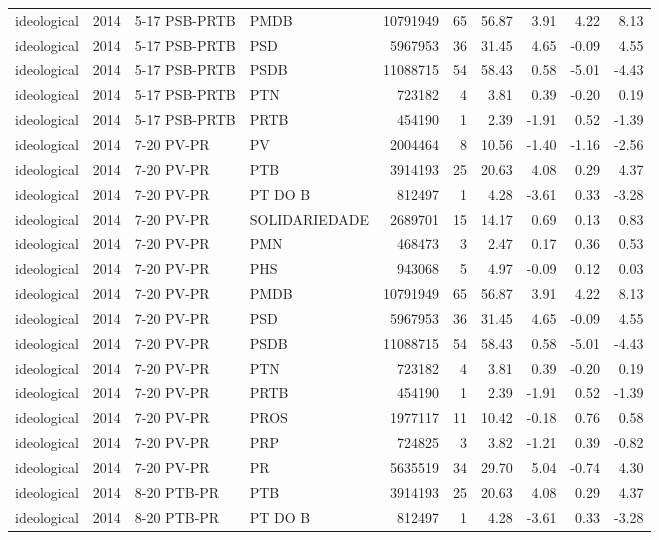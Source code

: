 \begin{landscape}
\begin{longtable}{lllL{2.8cm}rrrrrr}
ideological & 2014 & 5-17 PSB-PRTB & PMDB & 10791949 & 65 & 56.87 & 3.91 & 4.22 & 8.13 \\
ideological & 2014 & 5-17 PSB-PRTB & PSD & 5967953 & 36 & 31.45 & 4.65 & -0.09 & 4.55 \\
ideological & 2014 & 5-17 PSB-PRTB & PSDB & 11088715 & 54 & 58.43 & 0.58 & -5.01 & -4.43 \\
ideological & 2014 & 5-17 PSB-PRTB & PTN & 723182 & 4 & 3.81 & 0.39 & -0.20 & 0.19 \\
ideological & 2014 & 5-17 PSB-PRTB & PRTB & 454190 & 1 & 2.39 & -1.91 & 0.52 & -1.39 \\
ideological & 2014 & 7-20 PV-PR & PV & 2004464 & 8 & 10.56 & -1.40 & -1.16 & -2.56 \\
ideological & 2014 & 7-20 PV-PR & PTB & 3914193 & 25 & 20.63 & 4.08 & 0.29 & 4.37 \\
ideological & 2014 & 7-20 PV-PR & PT DO B & 812497 & 1 & 4.28 & -3.61 & 0.33 & -3.28 \\
ideological & 2014 & 7-20 PV-PR & SOLIDARIEDADE & 2689701 & 15 & 14.17 & 0.69 & 0.13 & 0.83 \\
ideological & 2014 & 7-20 PV-PR & PMN & 468473 & 3 & 2.47 & 0.17 & 0.36 & 0.53 \\
ideological & 2014 & 7-20 PV-PR & PHS & 943068 & 5 & 4.97 & -0.09 & 0.12 & 0.03 \\
ideological & 2014 & 7-20 PV-PR & PMDB & 10791949 & 65 & 56.87 & 3.91 & 4.22 & 8.13 \\
ideological & 2014 & 7-20 PV-PR & PSD & 5967953 & 36 & 31.45 & 4.65 & -0.09 & 4.55 \\
ideological & 2014 & 7-20 PV-PR & PSDB & 11088715 & 54 & 58.43 & 0.58 & -5.01 & -4.43 \\
ideological & 2014 & 7-20 PV-PR & PTN & 723182 & 4 & 3.81 & 0.39 & -0.20 & 0.19 \\
ideological & 2014 & 7-20 PV-PR & PRTB & 454190 & 1 & 2.39 & -1.91 & 0.52 & -1.39 \\
ideological & 2014 & 7-20 PV-PR & PROS & 1977117 & 11 & 10.42 & -0.18 & 0.76 & 0.58 \\
ideological & 2014 & 7-20 PV-PR & PRP & 724825 & 3 & 3.82 & -1.21 & 0.39 & -0.82 \\
ideological & 2014 & 7-20 PV-PR & PR & 5635519 & 34 & 29.70 & 5.04 & -0.74 & 4.30 \\
ideological & 2014 & 8-20 PTB-PR & PTB & 3914193 & 25 & 20.63 & 4.08 & 0.29 & 4.37 \\
ideological & 2014 & 8-20 PTB-PR & PT DO B & 812497 & 1 & 4.28 & -3.61 & 0.33 & -3.28 \\

\end{longtable}
\end{landscape}
